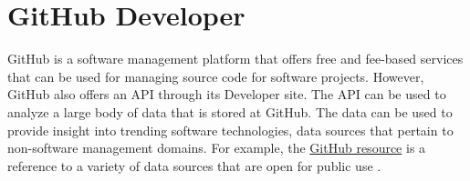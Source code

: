 \section{GitHub Developer}

GitHub is a software management platform that offers free and fee-based
services that can be used for managing source code for software projects.
However, GitHub also offers an API through its Developer site.  The API
can be used to analyze a large body of data that is stored at GitHub.  The
data can be used to provide insight into trending software technologies, data
sources that pertain to non-software management domains.  For example, the
\href{https://github.com/OpenRefine/OpenRefine/wiki/Data-Sources}{GitHub resource} 
is a reference to a variety of data sources that are open for public use 
\cite{GitHub.com2018}.
